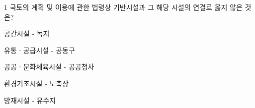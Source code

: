 \begin{question}{1}
국토의 계획 및 이용에 관한 법령상 기반시설과 그 해당 시설의 연결로 옳지 않은 것은?
\begin{choices}
  \item 공간시설 - 녹지
  \item 유통ㆍ공급시설 - 공동구
  \item 공공ㆍ문화체육시설 - 공공청사
  \item 환경기초시설 - 도축장
  \item 방재시설 - 유수지
\end{choices}
\end{question}
